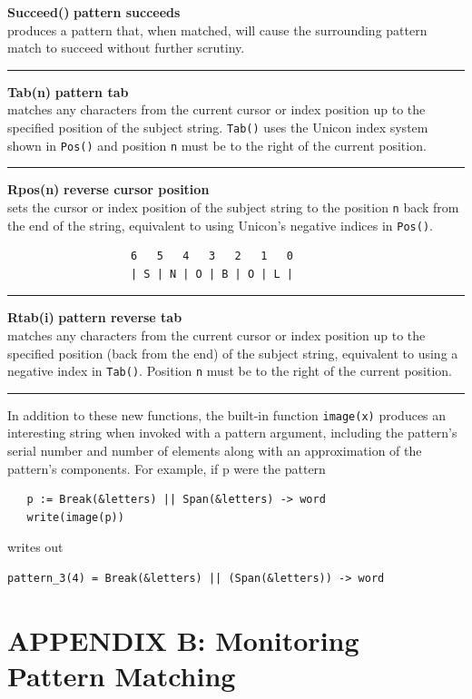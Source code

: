 \documentclass[letterpaper,12pt]{article}
\begin{document}
{\noindent\textbf{Succeed()} \hfill\textbf{pattern succeeds}\\
produces a pattern that, when matched, will cause the surrounding
pattern match to succeed without further scrutiny.\\
\noindent\rule{16.5cm}{0.1pt}

\noindent\textbf{Tab(n)} \hfill\textbf{pattern tab}\\
matches any characters from the current cursor or index position up to
the specified position of the subject string.  \texttt{Tab()} uses the
Unicon index system shown in \texttt{Pos()} and position \texttt{n} must
be to the right of the current position.\\
\noindent\rule{16.5cm}{0.1pt}

\noindent\textbf{Rpos(n)} \hfill\textbf{reverse cursor position}\\
sets the cursor or index position of the subject string to the
position \texttt{n} back from the end of the string, equivalent to
using Unicon's negative indices in \texttt{Pos()}.
\begin{verbatim}
                   6   5   4   3   2   1   0
                   | S | N | O | B | O | L |
\end{verbatim}
\noindent\rule{16.5cm}{0.1pt}

\noindent\textbf{Rtab(i)} \hfill\textbf{pattern reverse tab}\\
matches any characters from the current cursor or index position up to
the specified position (back from the end) of the subject string,
equivalent to using a negative index in \texttt{Tab()}.
Position \texttt{n} must be to the right of the current position.\\
\noindent\rule{16.5cm}{0.1pt}

In addition to these new functions, the built-in function
\texttt{image(x)} produces an interesting string when invoked with a
pattern argument, including the pattern's serial number and number of
elements along with an approximation of the pattern's components.
For example, if p were the pattern
\begin{verbatim}
   p := Break(&letters) || Span(&letters) -> word
   write(image(p))
\end{verbatim}
\noindent writes out

\begin{verbatim}
pattern_3(4) = Break(&letters) || (Span(&letters)) -> word
\end{verbatim}


\section*{APPENDIX B: Monitoring Pattern Matching}

}
\end{document}
